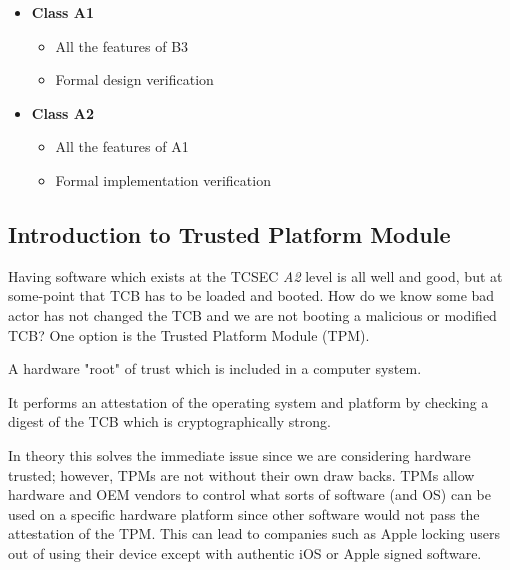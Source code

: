 \begin{itemize}
      \item \textbf{Class A1}
      \begin{itemize}
        \item All the features of B3
        \item Formal design verification
      \end{itemize}
      \item \textbf{Class A2}
      \begin{itemize}
        \item All the features of A1
        \item Formal implementation verification
      \end{itemize}
    \end{itemize}

  \subsection{Introduction to Trusted Platform Module}
  \label{ssec:intro_to_tpm}

    Having software which exists at the TCSEC \textit{A2} level is all well and good, but at some-point
      that TCB has to be loaded and booted.
    How do we know some bad actor has not changed the TCB and we are not booting a malicious or modified TCB?
    One option is the Trusted Platform Module (TPM).

    \begin{defbox}
      A hardware "root" of trust which is included in a computer system.

      It performs an attestation of the operating system and platform by checking a digest 
        of the TCB which is cryptographically strong.
    \end{defbox}

    In theory this solves the immediate issue since we are considering hardware trusted;
      however, TPMs are not without their own draw backs.
    TPMs allow hardware and OEM vendors to control what sorts of software (and OS) can be used
      on a specific hardware platform since other software would not pass the attestation of the TPM.
    This can lead to companies such as Apple locking users out of using their device except with authentic iOS
      or Apple signed software.
